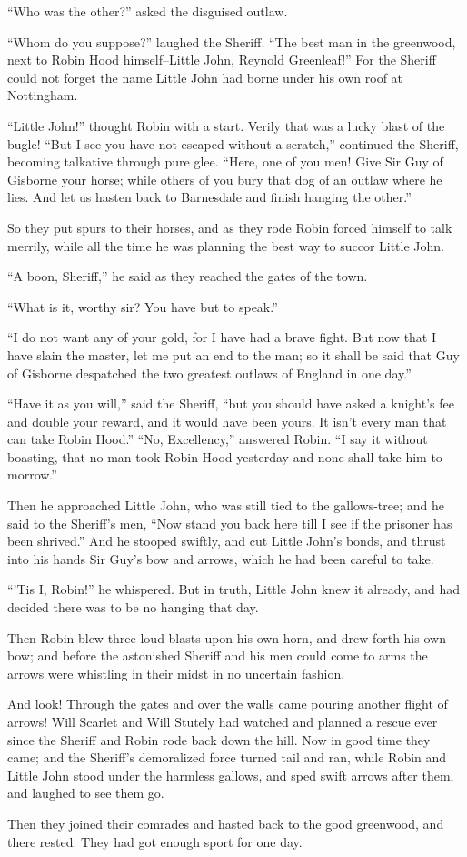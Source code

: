``Who was the other?'' asked the disguised outlaw.

``Whom do you suppose?'' laughed the Sheriff. ``The best man in the
greenwood, next to Robin Hood himself--Little John, Reynold Greenleaf!''
For the Sheriff could not forget the name Little John had borne under
his own roof at Nottingham.

``Little John!'' thought Robin with a start. Verily that was a lucky
blast of the bugle! ``But I see you have not escaped without a
scratch,'' continued the Sheriff, becoming talkative through pure glee.
``Here, one of you men! Give Sir Guy of Gisborne your horse; while
others of you bury that dog of an outlaw where he lies. And let us
hasten back to Barnesdale and finish hanging the other.''

So they put spurs to their horses, and as they rode Robin forced himself
to talk merrily, while all the time he was planning the best way to
succor Little John.

``A boon, Sheriff,'' he said as they reached the gates of the town.

``What is it, worthy sir? You have but to speak.''

``I do not want any of your gold, for I have had a brave fight. But now
that I have slain the master, let me put an end to the man; so it shall
be said that Guy of Gisborne despatched the two greatest outlaws of
England in one day.''

``Have it as you will,'' said the Sheriff, ``but you should have asked a
knight's fee and double your reward, and it would have been yours. It
isn't every man that can take Robin Hood.'' ``No, Excellency,'' answered
Robin. ``I say it without boasting, that no man took Robin Hood
yesterday and none shall take him to-morrow.''

Then he approached Little John, who was still tied to the gallows-tree;
and he said to the Sheriff's men, ``Now stand you back here till I see
if the prisoner has been shrived.'' And he stooped swiftly, and cut
Little John's bonds, and thrust into his hands Sir Guy's bow and arrows,
which he had been careful to take.

``'Tis I, Robin!'' he whispered. But in truth, Little John knew it
already, and had decided there was to be no hanging that day.

Then Robin blew three loud blasts upon his own horn, and drew forth his
own bow; and before the astonished Sheriff and his men could come to
arms the arrows were whistling in their midst in no uncertain fashion.

And look! Through the gates and over the walls came pouring another
flight of arrows! Will Scarlet and Will Stutely had watched and planned
a rescue ever since the Sheriff and Robin rode back down the hill. Now
in good time they came; and the Sheriff's demoralized force turned tail
and ran, while Robin and Little John stood under the harmless gallows,
and sped swift arrows after them, and laughed to see them go.

Then they joined their comrades and hasted back to the good greenwood,
and there rested. They had got enough sport for one day.
